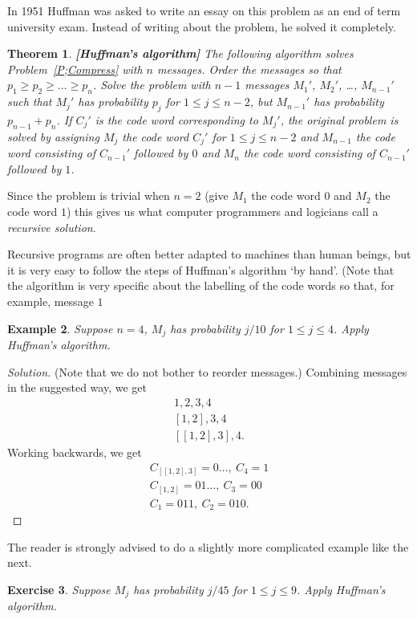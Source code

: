 \documentclass[12pt,a4paper]{article}
\theoremstyle{plain}
\newtheorem{theorem}{Theorem}[section]
\newtheorem{example}[theorem]{Example}
\newtheorem{exercise}[theorem]{Exercise}
\theoremstyle{definition}
\begin{document}
    In 1951 Huffman was asked to write an essay on this problem
    as an end of term university exam. Instead of writing about the problem,
    he solved it completely.
    \begin{theorem}
        \label{T;Huffman}{\bf [Huffman's algorithm]}
        The following algorithm
        solves Problem~\ref{P;Compress} with $n$ messages.
        Order the messages so that $p_{1}\geq p_{2}\geq \dots\geq p_{n}$.
        Solve the problem with $n-1$ messages $M_{1}'$, $M_{2}'$,
        \dots, $M_{n-1}'$ such that $M_{j}'$ has probability $p_{j}$
        for $1\leq j\leq n-2$, but $M_{n-1}'$ has probability
        $p_{n-1}+p_{n}$. If $C_{j}'$ is the code word corresponding
        to $M_{j}'$, the original problem is solved by assigning $M_{j}$
        the code word $C_{j}'$ for $1\leq j\leq n-2$ and
        $M_{n-1}$ the code word consisting of $C_{n-1}'$ followed
        by $0$ and $M_{n}$ the code word consisting of $C_{n-1}'$
        followed by $1$.
    \end{theorem}
    Since the problem is trivial when $n=2$ (give $M_{1}$ the code word $0$
    and $M_{2}$ the code word $1$) this gives us what computer programmers
    and logicians call a \emph{recursive solution}.

    Recursive programs are often
    better adapted to machines
    than human beings, but it is very easy
    to follow the steps of Huffman's algorithm `by hand'.
    (Note that the algorithm is very specific about
    the labelling of the code words so that, for example,
    message $1$

    \begin{example}
        \label{E;Huffman do}
        Suppose $n=4$, $M_{j}$ has probability $j/10$
        for $1\leq j\leq 4$. Apply Huffman's algorithm.
    \end{example}
    \begin{proof}[Solution]
        (Note that we do not bother to reorder messages.)
        Combining messages in the suggested way, we get
        \begin{gather*}
            1,2,3,4\\
            [1,2],3,4\\
            [[1,2],3],4.
        \end{gather*}
        Working backwards, we get
        \begin{gather*}
            C_{[[1,2],3]}=0\ldots,\ C_{4}=1\\
            C_{[1,2]}=01\dots,\ C_{3}=00\\
            C_{1}=011,\ C_{2}=010.
        \end{gather*}
    \end{proof}
    The reader is strongly advised to do a slightly more
    complicated example like the next.
    \begin{exercise}
        \label{E;Huffman 1}
        Suppose $M_{j}$ has probability $j/45$
        for $1\leq j\leq 9$. Apply Huffman's algorithm.
    \end{exercise}
\end{document}
